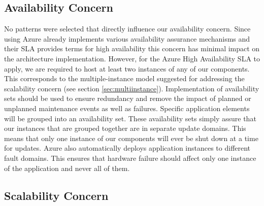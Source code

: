 \subsection{Availability Concern}
No patterns were selected that directly influence our availability concern. Since using Azure already implements various availability assurance mechanisms and their SLA provides terms for high availability this concern has minimal impact on the architecture implementation. However, for the Azure High Availability SLA to apply, we are required to host at least two instances of any of our components. This corresponds to the multiple-instance model suggested for addressing the scalability concern (see section \ref{sec:multiinstance}). Implementation of availability sets should be used to ensure redundancy and remove the impact of planned or unplanned maintenance events as well as failures. Specific application elements will be grouped into an availability set. These availability sets simply assure that our instances that are grouped together are in separate update domains. This means that only one instance of our components will ever be shut down at a time for updates. Azure also automatically deploys application instances to different fault domains. This ensures that hardware failure should affect only one instance of the application and never all of them. 


\subsection{Scalability Concern}

